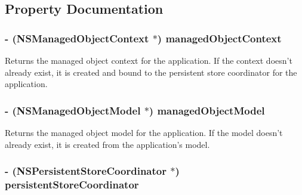 \subsection{Property Documentation}
\hypertarget{interface_p_b_app_delegate_af5d2f65acff5f2c9e7e4ad472f38dfff}{
\subsubsection[{managedObjectContext}]{\setlength{\rightskip}{0pt plus 5cm}-\/ (NSManagedObjectContext $\ast$) managedObjectContext}}
\label{interface_p_b_app_delegate_af5d2f65acff5f2c9e7e4ad472f38dfff}
Returns the managed object context for the application. If the context doesn't already exist, it is created and bound to the persistent store coordinator for the application. \hypertarget{interface_p_b_app_delegate_a688e19e1a5eeabf38cb33bc0e0630950}{
\subsubsection[{managedObjectModel}]{\setlength{\rightskip}{0pt plus 5cm}-\/ (NSManagedObjectModel $\ast$) managedObjectModel}}
\label{interface_p_b_app_delegate_a688e19e1a5eeabf38cb33bc0e0630950}
Returns the managed object model for the application. If the model doesn't already exist, it is created from the application's model. \hypertarget{interface_p_b_app_delegate_a11b8c3b6ec8fa5f88cd057beec16a166}{
\subsubsection[{persistentStoreCoordinator}]{\setlength{\rightskip}{0pt plus 5cm}-\/ (NSPersistentStoreCoordinator $\ast$) persistentStoreCoordinator}}
\label{interface_p_b_app_delegate_a11b8c3b6ec8fa5f88cd057beec16a166}
